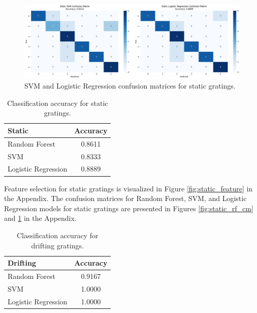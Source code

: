 \documentclass[10pt,twocolumn]{article}
\begin{document}
\begin{figure}[H]
  \centering
  \includegraphics[width=\linewidth]{report_images/static_SVM_LogR_confusion_matrix.png}
  \caption{SVM and Logistic Regression confusion matrices for static gratings.}
  \label{fig:static_svm_logr_cm}
\end{figure}

\begin{table}[H]
  \centering
  \begin{tabular}{l c}
    \hline
    \textbf{Static} & \textbf{Accuracy} \\
    \hline
    Random Forest        & 0.8611 \\
    SVM                  & 0.8333 \\
    Logistic Regression  & 0.8889 \\
    \hline
  \end{tabular}
  \caption{Classification accuracy for static gratings.}
  \label{tab:static_performance}
\end{table}

Feature selection for static gratings is visualized in Figure \ref{fig:static_feature} in the Appendix. The confusion matrices for Random Forest, SVM, and Logistic Regression models for static gratings are presented in Figures \ref{fig:static_rf_cm} and \ref{fig:static_svm_logr_cm} in the Appendix.

\begin{table}[H]
  \centering
  \begin{tabular}{l c}
    \hline
    \textbf{Drifting} & \textbf{Accuracy} \\
    \hline
    Random Forest        & 0.9167 \\
    SVM                  & 1.0000 \\
    Logistic Regression  & 1.0000 \\
    \hline
  \end{tabular}
  \caption{Classification accuracy for drifting gratings.}
  \label{tab:drifting_performance}
\end{table}
\end{document}
